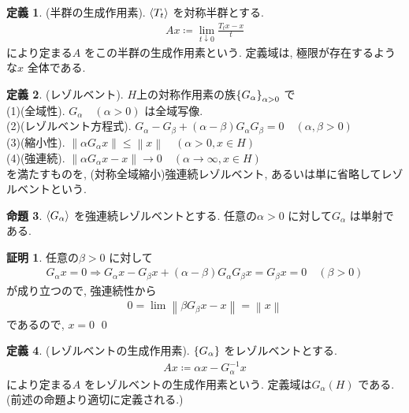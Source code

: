 \documentclass[10pt, fleqn, label-section=none]{bxjsarticle}
\theoremstyle{definition}
\newtheorem{dfn}{定義}[section]
\newtheorem{prop}[dfn]{命題}
\newtheorem*{pf*}{証明}
\newcommand{\cbra}[1]{\mleft\{#1\mright\}}
\newcommand{\tbra}[1]{\mleft\langle#1\mright\rangle}
\newcommand{\norm}[1]{\left\|#1\right\|}
\newcommand{\naraba}{\Rightarrow}
\renewcommand{\;}{\, ; \,}
\begin{document}
\begin{dfn}(半群の生成作用素). $\tbra{T_t}$ を対称半群とする. 
\begin{align*} Ax \coloneqq \lim_{t \downarrow 0} \frac{T_t x - x}{t} \end{align*}
により定まる$A$ をこの半群の生成作用素という. 定義域は, 極限が存在するような$x$ 全体である. 
\end{dfn}

\begin{dfn}(レゾルベント). $H$上の対称作用素の族$\cbra{G_\alpha}_{\alpha>0}$ で \\
(1)(全域性). $G_\alpha \quad (\alpha > 0)$ は全域写像. \\
(2)(レゾルベント方程式). $G_\alpha - G_\beta + (\alpha - \beta ) G_\alpha G_\beta = 0 \quad (\alpha, \beta > 0)$\\
(3)(縮小性). $\norm{\alpha G_\alpha x} \leq \norm{x} \quad (\alpha > 0 , x \in H)$ \\
(4)(強連続). $\norm{\alpha G_\alpha x - x} \rightarrow 0 \quad (\alpha \rightarrow \infty, x \in H)$ \\
を満たすものを, (対称全域縮小)強連続レゾルベント, あるいは単に省略してレゾルベントという. 
\end{dfn}

\begin{prop}
$\tbra{G_\alpha}$ を強連続レゾルベントとする. 任意の$\alpha > 0$ に対して$G_\alpha $ は単射である. 
\end{prop}
\begin{pf*}任意の$\beta > 0$ に対して
\begin{align*} G_\alpha x = 0 \naraba G_\alpha x - G_\beta x + (\alpha - \beta ) G_\alpha G_\beta x = G_\beta x = 0 \quad(\beta > 0)\end{align*}
が成り立つので, 強連続性から
\begin{align*} 0 = \lim \norm{\beta G_\beta x - x} = \norm{x}   \end{align*}
であるので, $x = 0$
\qed
\end{pf*}




\begin{dfn}(レゾルベントの生成作用素). $\cbra{G_\alpha}$ をレゾルベントとする. 
\begin{align*} Ax \coloneqq \alpha x - G^{-1}_\alpha x\end{align*}
により定まる$A$ をレゾルベントの生成作用素という. 定義域は$G_\alpha (H) $ である. (前述の命題より適切に定義される.)
\end{dfn}
\end{document}
